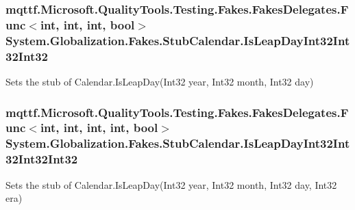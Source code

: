 \hypertarget{class_system_1_1_globalization_1_1_fakes_1_1_stub_calendar_a880c1e00f96dfa34c89b68b113158629}{
\subsubsection[{Is\-Leap\-Day\-Int32\-Int32\-Int32}]{\setlength{\rightskip}{0pt plus 5cm}mqttf.\-Microsoft.\-Quality\-Tools.\-Testing.\-Fakes.\-Fakes\-Delegates.\-Func$<$int, int, int, bool$>$ System.\-Globalization.\-Fakes.\-Stub\-Calendar.\-Is\-Leap\-Day\-Int32\-Int32\-Int32}}\label{class_system_1_1_globalization_1_1_fakes_1_1_stub_calendar_a880c1e00f96dfa34c89b68b113158629}


Sets the stub of Calendar.\-Is\-Leap\-Day(\-Int32 year, Int32 month, Int32 day)

\hypertarget{class_system_1_1_globalization_1_1_fakes_1_1_stub_calendar_a43eb2ac377507bdb5063b2b05efce6f7}{
\subsubsection[{Is\-Leap\-Day\-Int32\-Int32\-Int32\-Int32}]{\setlength{\rightskip}{0pt plus 5cm}mqttf.\-Microsoft.\-Quality\-Tools.\-Testing.\-Fakes.\-Fakes\-Delegates.\-Func$<$int, int, int, int, bool$>$ System.\-Globalization.\-Fakes.\-Stub\-Calendar.\-Is\-Leap\-Day\-Int32\-Int32\-Int32\-Int32}}\label{class_system_1_1_globalization_1_1_fakes_1_1_stub_calendar_a43eb2ac377507bdb5063b2b05efce6f7}


Sets the stub of Calendar.\-Is\-Leap\-Day(\-Int32 year, Int32 month, Int32 day, Int32 era)

